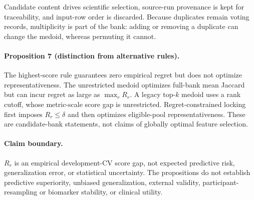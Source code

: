 Candidate content drives scientific selection, source-run provenance is kept
for traceability, and input-row order is discarded. Because duplicates remain
voting records, multiplicity is part of the bank: adding or removing a
duplicate can change the medoid, whereas permuting it cannot.

\paragraph{Proposition 7 (distinction from alternative rules).}
The highest-score rule guarantees zero empirical regret but does not optimize
representativeness. The unrestricted medoid optimizes full-bank mean Jaccard
but can incur regret as large as $\max_rR_r$. A legacy top-$k$ medoid uses a
rank cutoff, whose metric-scale score gap is unrestricted. Regret-constrained
locking first imposes $R_r\leq\delta$ and then optimizes eligible-pool
representativeness. These are candidate-bank statements, not claims of
globally optimal feature selection.

\paragraph{Claim boundary.}
$R_r$ is an empirical development-CV score gap, not expected predictive risk,
generalization error, or statistical uncertainty. The propositions do not
establish predictive superiority, unbiased generalization, external validity,
participant-resampling or biomarker stability, or clinical utility.
